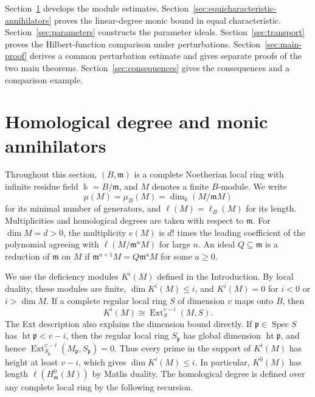 \documentclass[11pt,reqno]{amsart}
\numberwithin{equation}{section}
\theoremstyle{definition}
\newcommand{\m}{\mathfrak m}
\begin{document}
Section~\ref{sec:module-annihilators} develops the module estimates.
Section~\ref{sec:equicharacteristic-annihilators} proves the
linear-degree monic bound in equal characteristic.
Section~\ref{sec:parameters} constructs the parameter ideals.
Section~\ref{sec:transport} proves the Hilbert-function comparison under
perturbations. Section~\ref{sec:main-proof} derives a common
perturbation estimate and gives separate proofs of the two main theorems. Section~\ref{sec:consequences} gives the consequences
and a comparison example.


\section{Homological degree and monic annihilators}
\label{sec:module-annihilators}

Throughout this section, $(B,\m)$ is a complete Noetherian local ring
with infinite residue field $\Bbbk=B/\m$, and $M$ denotes a finite
$B$-module. We write
\[
 \mu(M)=\mu_B(M)=\dim_{\Bbbk}(M/\m M)
\]
for its minimal number of generators, and $\ell(M)=\ell_B(M)$ for its
length. Multiplicities and homological degrees are taken with respect
to $\m$. For $\dim M=d>0$, the
multiplicity $e(M)$ is $d!$ times the leading coefficient of the
polynomial agreeing with $\ell(M/\m^nM)$ for large $n$.
An ideal $Q\subseteq\m$ is a reduction of $\m$ on $M$ if
$\m^{a+1}M=Q\m^aM$ for some $a\geq0$.

We use the deficiency modules $K^i(M)$ defined in the Introduction.
By local duality, these modules are finite, $\dim K^i(M)\leq i$, and
$K^i(M)=0$ for $i<0$ or $i>\dim M$. If a complete regular
local ring $S$ of dimension $v$ maps onto $B$, then
\[
 K^i(M)\cong\operatorname{Ext}^{v-i}_S(M,S).
\]
The Ext description also explains the dimension bound directly.
If $\mathfrak p\in\operatorname{Spec}S$ has
$\operatorname{ht}\mathfrak p<v-i$, then the regular local ring
$S_{\mathfrak p}$ has global dimension $\operatorname{ht}\mathfrak p$,
and hence
$\operatorname{Ext}^{v-i}_{S_{\mathfrak p}}
 (M_{\mathfrak p},S_{\mathfrak p})=0$.
Thus every prime in the support of $K^i(M)$ has height at least
$v-i$, which gives $\dim K^i(M)\le i$.
In particular, $K^0(M)$ has length $\ell(H^0_{\m}(M))$ by
Matlis duality. The homological degree is defined over any complete
local ring by the following recursion.
\end{document}
